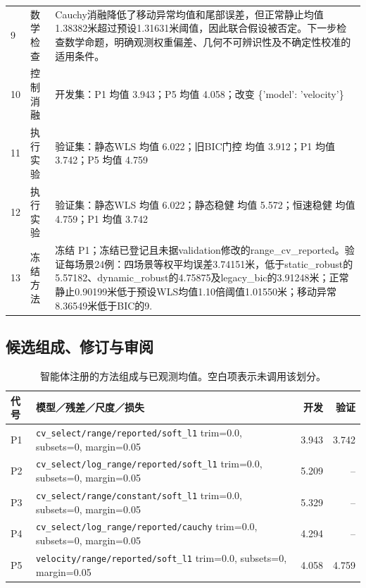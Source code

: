 \begin{longtable}{@{}p{8mm}p{23mm}p{121mm}@{}}
9 & 数学检查 & Cauchy消融降低了移动异常均值和尾部误差，但正常静止均值1.38382米超过预设1.31631米阈值，因此联合假设被否定。下一步检查数学命题，明确观测权重偏差、几何不可辨识性及不确定性校准的适用条件。\\[3pt]

10 & 控制消融 & 开发集：P1 均值 3.943；P5 均值 4.058；改变 \{'model': 'velocity'\}\\[3pt]

11 & 执行实验 & 验证集：静态WLS 均值 6.022；旧BIC门控 均值 3.912；P1 均值 3.742；P5 均值 4.759\\[3pt]

12 & 执行实验 & 验证集：静态WLS 均值 6.022；静态稳健 均值 5.572；恒速稳健 均值 4.759；P1 均值 3.742\\[3pt]

13 & 冻结方法 & 冻结 P1；冻结已登记且未据validation修改的range\_\allowbreak{}cv\_\allowbreak{}reported。验证每场景24例：四场景等权平均误差3.74151米，低于static\_\allowbreak{}robust的5.57182、dynamic\_\allowbreak{}robust的4.75875及legacy\_\allowbreak{}bic的3.91248米；正常静止0.90199米低于预设WLS均值1.10倍阈值1.01550米；移动异常8.36549米低于BIC的9.\\[3pt]

\end{longtable}\endgroup

\subsection{候选组成、修订与审阅}

\begin{table}[H]\centering\small
\caption{智能体注册的方法组成与已观测均值。空白项表示未调用该划分。}

\begin{tabular}{p{8mm}p{104mm}rr}
\toprule
代号 & 模型／残差／尺度／损失 & 开发 & 验证\\
\midrule
P1 & \texttt{cv\_\allowbreak{}select/range/reported/soft\_\allowbreak{}l1} \newline trim=0.0, subsets=0, margin=0.05 & 3.943 & 3.742\\
P2 & \texttt{cv\_\allowbreak{}select/log\_\allowbreak{}range/reported/soft\_\allowbreak{}l1} \newline trim=0.0, subsets=0, margin=0.05 & 5.209 & --\\
P3 & \texttt{cv\_\allowbreak{}select/range/constant/soft\_\allowbreak{}l1} \newline trim=0.0, subsets=0, margin=0.05 & 5.329 & --\\
P4 & \texttt{cv\_\allowbreak{}select/log\_\allowbreak{}range/reported/cauchy} \newline trim=0.0, subsets=0, margin=0.05 & 4.294 & --\\
P5 & \texttt{velocity/range/reported/soft\_\allowbreak{}l1} \newline trim=0.0, subsets=0, margin=0.05 & 4.058 & 4.759\\
\bottomrule\end{tabular}\end{table}

